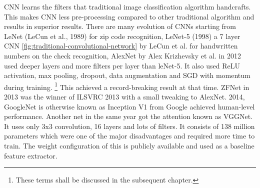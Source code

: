 \newpara CNN learns the filters that traditional image classification algorithm handcrafts. This makes CNN less pre-processing compared to other traditional algorithm and results in superior results. There are many evolution of CNNs starting from LeNet (LeCun et al., 1989) for zip code recognition, LeNet-5 (1998) a 7 layer CNN \ref{fig:traditional-convolutional-network} by LeCun et al. for handwritten numbers on the check recognition, AlexNet by Alex Krizhevsky et al. in 2012 used deeper layers and more filters per layer than leNet-5. It also used ReLU activation, max pooling, dropout, data augmentation and SGD with momentum during training. \footnote{These terms shall be discussed in the subsequent chapter.} This achieved a record-breaking result at that time. ZFNet in 2013 was the winner of ILSVRC 2013 with a small tweaking to AlexNet. 2014, GoogleNet is otherwise known as Inception V1 from Google achieved human-level performance. Another net in the same year got the attention known as VGGNet. It uses only 3x3 convolution, 16 layers and lots of filters. It consists of 138 million parameters which were one of the major disadvantages and required more time to train. The weight configuration of this is publicly available and used as a baseline feature extractor.


